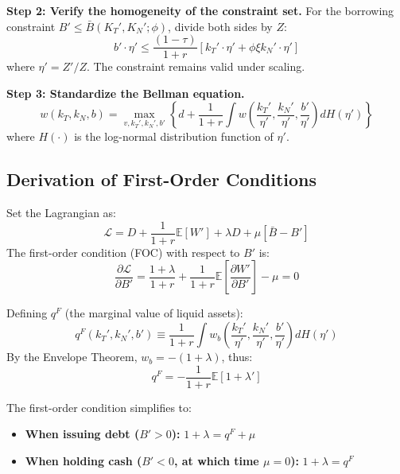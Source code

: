 \documentclass[12pt,a4paper]{article}
\begin{document}
\textbf{Step 2: Verify the homogeneity of the constraint set.}
For the borrowing constraint $B' \le \bar{B}(K_T', K_N'; \phi)$, divide both sides by $Z$:
\begin{equation}
b' \cdot \eta' \le \frac{(1-\tau)}{1+r} [k_T' \cdot \eta' + \phi \xi k_N' \cdot \eta']
\end{equation}
where $\eta' = Z'/Z$. The constraint remains valid under scaling.

\textbf{Step 3: Standardize the Bellman equation.}
\begin{equation}
w(k_T, k_N, b) = \max_{v, k_T', k_N', b'} \left\{ d + \frac{1}{1+r} \int w \left( \frac{k_T'}{\eta'}, \frac{k_N'}{\eta'}, \frac{b'}{\eta'} \right) dH(\eta') \right\}
\end{equation}
where $H(\cdot)$ is the log-normal distribution function of $\eta'$. 

\subsection{Derivation of First-Order Conditions}
Set the Lagrangian as:
\begin{equation}
\mathcal{L} = D + \frac{1}{1+r} \mathbb{E}[W'] + \lambda D + \mu[\bar{B} - B']
\end{equation}
The first-order condition (FOC) with respect to $B'$ is:
\begin{equation}
\frac{\partial \mathcal{L}}{\partial B'} = \frac{1+\lambda}{1+r} + \frac{1}{1+r} \mathbb{E} \left[ \frac{\partial W'}{\partial B'} \right] - \mu = 0
\end{equation}

Defining $q^F$ (the marginal value of liquid assets):
\begin{equation}
q^F(k_T', k_N', b') \equiv \frac{1}{1+r} \int w_b \left( \frac{k_T'}{\eta'}, \frac{k_N'}{\eta'}, \frac{b'}{\eta'} \right) dH(\eta')
\end{equation}
By the Envelope Theorem, $w_b = -(1+\lambda)$, thus:
\begin{equation}
q^F = -\frac{1}{1+r} \mathbb{E}[1 + \lambda']
\end{equation}

The first-order condition simplifies to:
\begin{itemize}
    \item[(a)] \textbf{When issuing debt ($B' > 0$):} $1 + \lambda = q^F + \mu$
    \item[(b)] \textbf{When holding cash ($B' < 0$, at which time $\mu = 0$):} $1 + \lambda = q^F$
\end{itemize}
\end{document}
